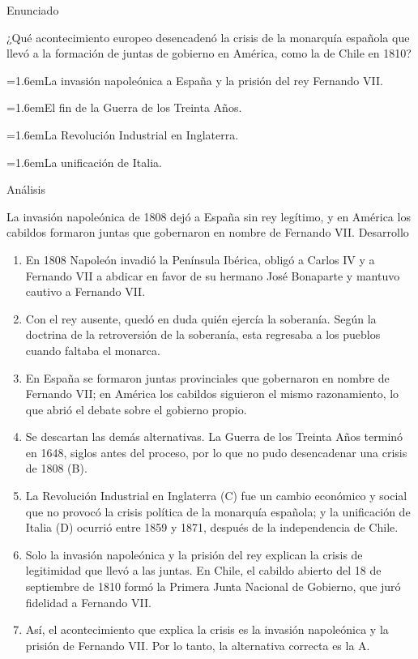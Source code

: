 \documentclass[10pt,a4paper,twocolumn]{article}
\newcommand{\alternativa}[2]{\par\noindent\hangindent=1.6em\hangafter=1\makebox[1.6em][l]{\tecla{#1}}#2\par}
\newcommand{\clave}[1]{\par\smallskip{\sffamily\footnotesize\color{esmeralda} Clave \teclaok{#1}}\par}
\begin{document}
\begin{ejemplo}
{\sffamily\footnotesize\color{zinc500} Enunciado}\par
¿Qué acontecimiento europeo desencadenó la crisis de la monarquía española que llevó a la formación de juntas de gobierno en América, como la de Chile en 1810?
\alternativa{A}{La invasión napoleónica a España y la prisión del rey Fernando VII.}
\alternativa{B}{El fin de la Guerra de los Treinta Años.}
\alternativa{C}{La Revolución Industrial en Inglaterra.}
\alternativa{D}{La unificación de Italia.}
\clave{A}
{\sffamily\footnotesize\color{zinc500} Análisis}\par La invasión napoleónica de 1808 dejó a España sin rey legítimo, y en América los cabildos formaron juntas que gobernaron en nombre de Fernando VII.
{\sffamily\footnotesize\color{zinc500} Desarrollo}
\begin{enumerate}
  \item En 1808 Napoleón invadió la Península Ibérica, obligó a Carlos IV y a Fernando VII a abdicar en favor de su hermano José Bonaparte y mantuvo cautivo a Fernando VII.
  \item Con el rey ausente, quedó en duda quién ejercía la soberanía. Según la doctrina de la retroversión de la soberanía, esta regresaba a los pueblos cuando faltaba el monarca.
  \item En España se formaron juntas provinciales que gobernaron en nombre de Fernando VII; en América los cabildos siguieron el mismo razonamiento, lo que abrió el debate sobre el gobierno propio.
  \item Se descartan las demás alternativas. La Guerra de los Treinta Años terminó en 1648, siglos antes del proceso, por lo que no pudo desencadenar una crisis de 1808 (B).
  \item La Revolución Industrial en Inglaterra (C) fue un cambio económico y social que no provocó la crisis política de la monarquía española; y la unificación de Italia (D) ocurrió entre 1859 y 1871, después de la independencia de Chile.
  \item Solo la invasión napoleónica y la prisión del rey explican la crisis de legitimidad que llevó a las juntas. En Chile, el cabildo abierto del 18 de septiembre de 1810 formó la Primera Junta Nacional de Gobierno, que juró fidelidad a Fernando VII.
  \item Así, el acontecimiento que explica la crisis es la invasión napoleónica y la prisión de Fernando VII. Por lo tanto, la alternativa correcta es la A.
\end{enumerate}
\end{ejemplo}
\end{document}
